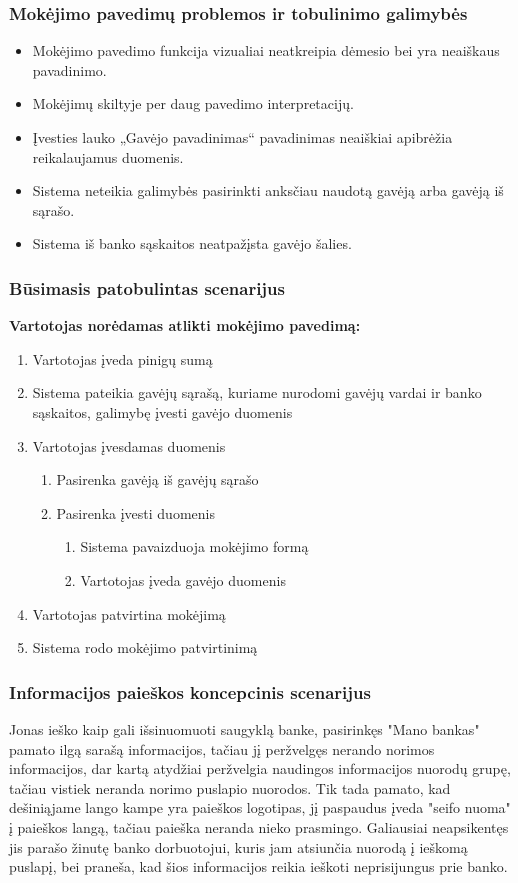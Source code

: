 \documentclass{VUMIFPSkursinis}
\begin{document}
\subsubsection{Mokėjimo pavedimų problemos ir tobulinimo galimybės}
\begin{itemize}
	\item Mokėjimo pavedimo funkcija vizualiai neatkreipia dėmesio bei yra neaiškaus pavadinimo.
	\item Mokėjimų skiltyje per daug pavedimo interpretacijų.
	\item Įvesties lauko „Gavėjo pavadinimas“ pavadinimas neaiškiai apibrėžia reikalaujamus duomenis.
	\item Sistema neteikia galimybės pasirinkti anksčiau naudotą gavėją arba gavėją iš sąrašo.
	\item Sistema iš banko sąskaitos neatpažįsta gavėjo šalies.
\end{itemize}
\subsubsection{Būsimasis patobulintas scenarijus}
\begin{center}
\textbf{Vartotojas norėdamas atlikti mokėjimo pavedimą:}
\end{center}
\begin{enumerate}
	\item Vartotojas įveda pinigų sumą
	\item Sistema pateikia gavėjų sąrašą, kuriame nurodomi gavėjų vardai ir banko sąskaitos, galimybę įvesti gavėjo duomenis 
	\item Vartotojas įvesdamas duomenis
\begin{enumerate}
	\item Pasirenka gavėją iš gavėjų sąrašo
	\item Pasirenka įvesti duomenis
\begin{enumerate}
	\item Sistema pavaizduoja mokėjimo formą
	\item Vartotojas įveda gavėjo duomenis
\end{enumerate}
\end{enumerate}
	\item Vartotojas patvirtina mokėjimą
	\item Sistema rodo mokėjimo patvirtinimą
\end{enumerate}
\subsubsection{Informacijos paieškos koncepcinis scenarijus}
Jonas ieško kaip gali išsinuomuoti saugyklą banke, pasirinkęs "Mano bankas" pamato ilgą sarašą informacijos, tačiau jį peržvelgęs nerando norimos informacijos, dar kartą atydžiai peržvelgia naudingos informacijos nuorodų grupę, tačiau vistiek neranda norimo puslapio nuorodos. Tik tada pamato, kad dešiniąjame lango kampe yra paieškos logotipas, jį paspaudus įveda "seifo nuoma" į paieškos langą, tačiau paieška neranda nieko prasmingo. Galiausiai neapsikentęs jis parašo žinutę banko dorbuotojui, kuris jam atsiunčia nuorodą į ieškomą puslapį, bei praneša, kad šios informacijos reikia ieškoti neprisijungus prie banko. 
\end{document}

